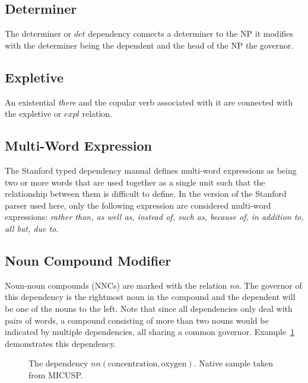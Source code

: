\documentclass[main.tex]{subfiles}
\begin{document}
\subsection{Determiner}

The determiner or $det$ dependency connects a determiner to the NP it modifies with the determiner being the dependent and the head of the NP the governor.

\subsection{Expletive}

An existential \textit{there} and the copular verb associated with it are connected with the expletive or $expl$ relation.

\subsection{Multi-Word Expression}

The Stanford typed dependency manual \citep{typed-deps-manual} defines multi-word expressions as being two or more words that are used together as a single unit such that the relationship between them is difficult to define. In the version of the Stanford parser used here, only the following expression are considered multi-word expressions: \textit{rather than, as well as, instead of, such as, because of, in addition to, all but, due to}.

\subsection{Noun Compound Modifier}

Noun-noun compounds (NNCs) are marked with the relation \textit{nn}. The governor of this dependency is the rightmost noun in the compound and the dependent will be one of the nouns to the left. Note that since all dependencies only deal with pairs of words, a compound consisting of more than two nouns would be indicated by multiple dependencies, all sharing a common governor. Example~\ref{fig:nn-deps} demonstrates this dependency. 

\begin{figure}[htbp]
\caption{The dependency $nn(\text{concentration}, \text{oxygen})$. Native sample taken from MICUSP.}
\centering
{}
\label{fig:nn-deps}
\end{figure}
\end{document}
